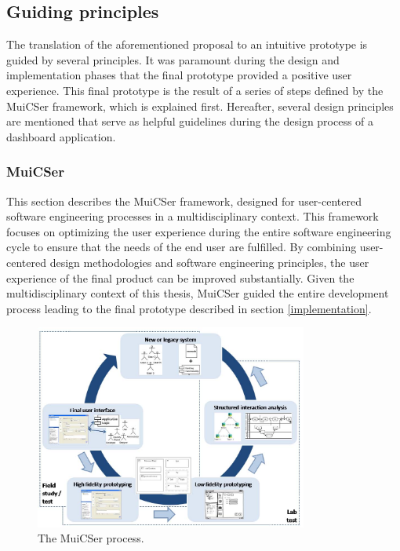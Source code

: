     \subsection{Guiding principles}

    The translation of the aforementioned proposal to an intuitive prototype is guided by several principles. It was paramount during the design and implementation phases that the final prototype provided a positive user experience. This final prototype is the result of a series of steps defined by the MuiCSer framework, which is explained first. Hereafter, several design principles are mentioned that serve as helpful guidelines during the design process of a dashboard application.

        \subsubsection{MuiCSer}\label{muicser}
        This section describes the MuiCSer framework, designed for user-centered software engineering processes in a multidisciplinary context\cite{Haesen2008}. This framework focuses on optimizing the user experience during the entire software engineering cycle to ensure that the needs of the end user are fulfilled. By combining user-centered design methodologies and software engineering principles, the user experience of the final product can be improved substantially. Given the multidisciplinary context of this thesis, MuiCSer guided the entire development process leading to the final prototype described in section \ref{implementation}. %
        
        \begin{figure}[!t]
            \centering
            \includegraphics[width=0.8\textwidth]{chapters/3_design/muicser}
            \caption{The MuiCSer process.}\label{fig:muicser}
        \end{figure}

